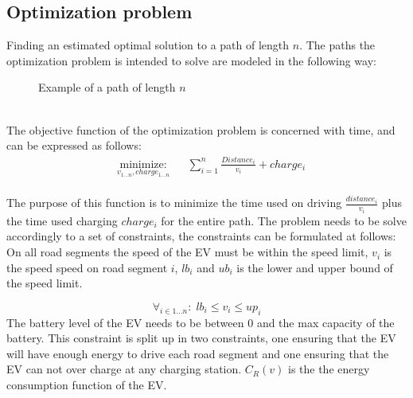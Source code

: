 \subsection{Optimization problem}
Finding an estimated optimal solution to a path of length $n$. The paths the optimization problem is intended to solve are modeled in the following way: \\
\begin{figure}[h!]
\centering
    \caption{Example of a path of length $n$} \label{fig:pathexample}
\end{figure} \\

The objective function of the optimization problem is concerned with time, and can be expressed as follows:
\begin{equation}
\begin{aligned}
 & \underset{v_{1 \dots n},charge_{1 \dots n}}
{\text{minimize:}}
& & \sum_{i=1}^{n} \frac{Distance_i}{v_i} + charge_i \\
\end{aligned}
\end{equation}\label{eq:objfunction}

The purpose of this function is to minimize the time used on driving $\frac{distance_i}{v_i}$ plus the time used charging $charge_i$ for the entire path. 
The problem needs to be solve accordingly to a set of constraints, the constraints can be formulated at follows: \\
On all road segments the speed of the EV must be within the speed limit, $v_i$ is the speed speed on road segment $i$, $lb_i$ and $ub_i$ is the lower and upper bound of the speed limit.
 
\begin{equation}
\forall_{i \in 1 \dots n}: \; lb_i \leq v_i \leq up_i
\end{equation}
The battery level of the EV needs to be between $0$ and the max capacity of the battery. This constraint is split up in two constraints, one ensuring that the EV will have enough energy to drive each road segment and one ensuring that the EV can not over charge at any charging station. $C_R(v)$ is the the energy consumption function of the EV.

